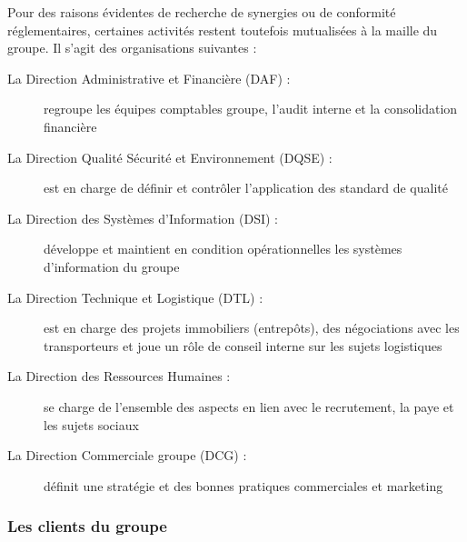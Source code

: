             Pour des raisons évidentes de recherche de synergies ou de conformité réglementaires, certaines activités restent toutefois mutualisées à la maille du groupe.
            Il s'agit des organisations suivantes :
            \begin{description}
                \item[La Direction Administrative et Financière (DAF) :] regroupe les équipes comptables groupe, l'audit interne et la consolidation financière
                \item[La Direction Qualité Sécurité et Environnement (DQSE) :] est en charge de définir et contrôler l'application des standard de qualité
                \item[La Direction des Systèmes d'Information (DSI) :] développe et maintient en condition opérationnelles les systèmes d'information du groupe
                \item[La Direction Technique et Logistique (DTL) :] est en charge des projets immobiliers (entrepôts), des négociations avec les transporteurs et joue un rôle de conseil interne sur les sujets logistiques
                \item[La Direction des Ressources Humaines :] se charge de l'ensemble des aspects en lien avec le recrutement, la paye et les sujets sociaux
                \item[La Direction Commerciale groupe (DCG) :] définit une stratégie et des bonnes pratiques commerciales et marketing
            \end{description}

            \subsubsection{Les clients du groupe}
            \label{clients}

